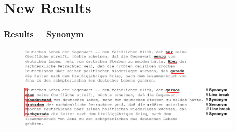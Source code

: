 \documentclass{beamer}
\begin{document}
\section{New Results}

\begin{frame}
\frametitle{Results $-$ Synonym}
\begin{figure}
\includegraphics[scale=0.35]{beispiel-synonym}
\end{figure}
\end{frame}
\end{document}
